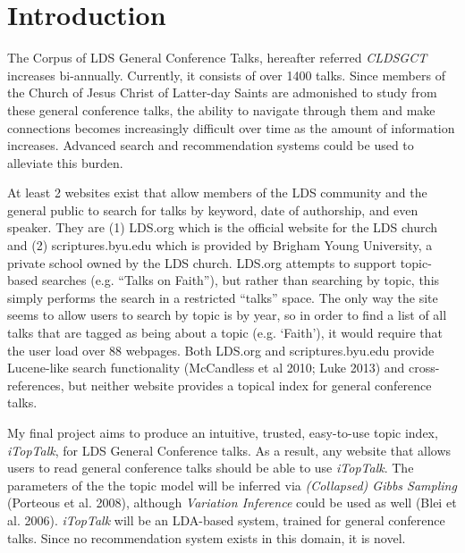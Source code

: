 \section {Introduction}


The Corpus of LDS General Conference Talks, hereafter referred \emph{CLDSGCT} increases bi-annually. Currently, it consists of over 1400 talks. Since members of the Church of Jesus Christ of Latter-day Saints are admonished to study from these general conference talks, the ability to navigate through them and make connections becomes increasingly difficult over time as the amount of information increases. Advanced search and recommendation systems could be used to alleviate this burden.


At least 2 websites exist that allow members of the LDS community and the general public to search for talks by keyword, date of authorship, and even speaker. They are (1) LDS.org which is the official website for the LDS church and (2) scriptures.byu.edu which is provided by Brigham Young University, a private school owned by the LDS church. LDS.org attempts to support topic-based searches (e.g. ``Talks on Faith''), but rather than searching by topic, this simply performs the search in a restricted ``talks'' space. The only way the site seems to allow users to search by topic is by year, so in order to find a list of all talks that are tagged as being about a topic (e.g. `Faith'), it would require that the user load over 88 webpages. Both LDS.org and scriptures.byu.edu provide Lucene-like search functionality (McCandless et al 2010; Luke 2013) and cross-references, but neither website provides a topical index for general conference talks.

My final project aims to produce an intuitive, trusted, easy-to-use topic index, \emph{iTopTalk}, for LDS General Conference talks. As a result, any website that allows users to read general conference talks should be able to use \emph{iTopTalk}. The parameters of the the topic model will be inferred via \emph{(Collapsed) Gibbs Sampling}
(Porteous et al. 2008), %
 although \emph{Variation Inference} could be used as well (Blei et al. 2006). %
\emph{iTopTalk} will be an LDA-based system, trained for general conference talks. Since no recommendation system exists in this domain, it is novel. 


